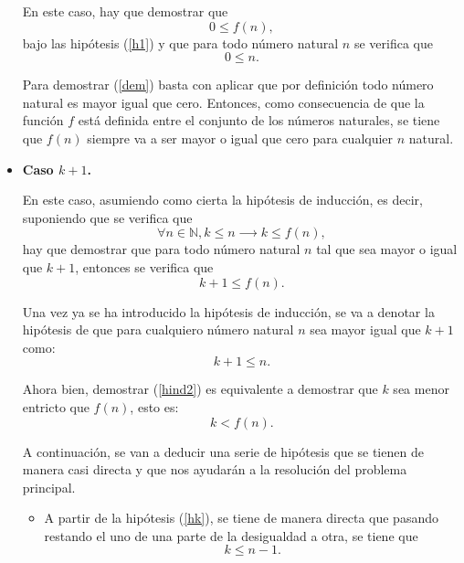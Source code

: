 \begin{demostracion}
\begin{itemize}
      En este caso, hay que demostrar que
      \begin{equation}\label{dem}
        0≤f(n),
      \end{equation}
      bajo las hipótesis (\ref{h1}) y que para todo número natural
      \(n\) se verifica que
      \begin{equation}
        0≤ n. 
      \end{equation}

      Para demostrar (\ref{dem}) basta con aplicar que por
      definición todo número natural es mayor igual que cero.
      Entonces, como consecuencia de que la función \(f\) está
      definida entre el conjunto de los números naturales, se tiene
      que \(f(n)\) siempre va a ser mayor o igual que cero para
      cualquier \(n\) natural.
      
    \item \textbf{Caso \(k+1\).}
    
      En este caso, asumiendo como cierta la hipótesis de inducción,
      es decir, suponiendo que se verifica que
      \begin{equation}\label{hind}\tag{h\(\_\)ind}
        ∀ n ∈ ℕ, k≤ n ⟶ k ≤ f(n),
      \end{equation}
      hay que demostrar que para todo número natural \(n\) tal que
      sea mayor o igual que \(k+1\), entonces se verifica que
      \begin{equation}\label{hind2}
        k+1 ≤ f(n).
      \end{equation}

      Una vez ya se ha introducido la hipótesis de inducción, se va
      a denotar la hipótesis de que para cualquiero número natural
      \(n\) sea mayor igual que \(k+1\) como:
      \begin{equation}\label{hk}\tag{hk}
        k+1≤n.
      \end{equation}

      Ahora bien, demostrar (\ref{hind2}) es equivalente a demostrar
      que \(k\) sea menor entricto que \(f(n)\), esto es:
      \begin{equation}\label{hind3}
        k<f(n).
      \end{equation}

      A continuación, se van a deducir una serie de hipótesis que se
      tienen de manera casi directa y que nos ayudarán a la
      resolución del problema principal.
      \begin{itemize}
      \item A partir de la hipótesis (\ref{hk}), se tiene de manera
        directa que pasando restando el uno de una parte de la
        desigualdad a otra, se tiene que
        \begin{equation}\label{hk1}\tag{hk1}
          k≤n-1.
        \end{equation}
        

\end{itemize}
\end{itemize}
\end{demostracion}
